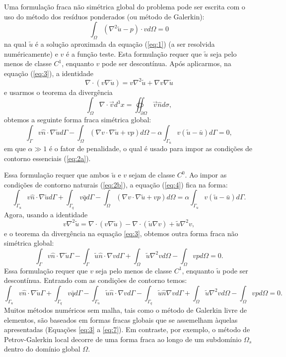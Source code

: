 \documentclass[10pt,a4paper]{article}
\newcommand{\prt}[1]{\left(#1\right)}
\begin{document}
	Uma formulação fraca não simétrica global do problema pode ser escrita com o uso do método dos resíduos ponderados (ou método de Galerkin):
	\begin{equation}
		\int_\Omega \prt{\nabla^2\tilde{u} - p}\cdot vd\Omega = 0
		\label{eq:3}
	\end{equation}
	na qual $\tilde{u}$ é a solução aproximada da equação (\ref{eq:1}) (a ser resolvida numéricamente) e $v$ é a função teste. Esta formulação requer que $\tilde{u}$ seja pelo menos de classe $C^1$, enquanto $v$ pode ser descontínua. Após aplicarmos, na equação (\ref{eq:3}), a identidade \[\nabla\cdot\prt{v\nabla\tilde{u}} = v\nabla^2\tilde{u} + \nabla v\nabla\tilde{u}\] e usarmos o teorema da divergência \[\int_\Omega\nabla\cdot\vec{v} d^3x = \oiint_{\partial\Omega}\vec{v}\hat{n}d\sigma,\] obtemos a seguinte forma fraca simétrica global:
	\begin{equation}
		\int_\Gamma v\hat{n}\cdot\nabla\tilde{u} d\Gamma - \int_\Omega\prt{\nabla v\cdot\nabla\tilde{u}+vp}d\Omega - \alpha\int_{\Gamma_u} v\prt{\tilde{u}-\bar{u}}d\Gamma = 0,
		\label{eq:4}
	\end{equation}
	em que $\alpha\gg 1$ é o fator de penalidade, o qual é usado para impor as condições de contorno essenciais (\ref{eq:2a}).

	Essa formulação requer que ambos $\tilde{u}$ e $v$ sejam de classe $C^0$. Ao impor as condições de contorno naturais (\ref{eq:2b}), a equação (\ref{eq:4}) fica na forma:
	\begin{equation}
		\int_{\Gamma_u} v\hat{n}\cdot\nabla\tilde{u} d\Gamma +\int_{\Gamma_q} v\bar{q}d\Gamma - \int_\Omega\prt{\nabla v\cdot\nabla\tilde{u}+vp}d\Omega = \alpha\int_{\Gamma_u} v\prt{\tilde{u}-\bar{u}}d\Gamma.
		\label{eq:5}
	\end{equation}
	Agora, usando a identidade \[v\nabla^2\tilde{u} = \nabla\cdot(v\nabla\tilde{u}) - \nabla\cdot(\tilde{u}\nabla v) + \tilde{u}\nabla^2v,\] e o teorema da divergência na equação \ref{eq:3}, obtemos outra forma fraca não simétrica global:
	\begin{equation}
		\int_{\Gamma} v\hat{n}\cdot\nabla\tilde{u}\Gamma - \int_{\Gamma} \tilde{u}\hat{n}\cdot\nabla vd\Gamma + \int_\Omega \tilde{u}\nabla^2vd\Omega - \int_\Omega vpd\Omega = 0.
		\label{eq:6}
	\end{equation}
	Essa formulação requer que $v$ seja pelo menos de classe $C^1$, enquanto $\tilde{u}$ pode ser descontínua. Entrando com as condições de contorno temos:
	\begin{equation}
		\int_{\Gamma_u} v\hat{n}\cdot\nabla\tilde{u}\Gamma + \int_{\Gamma_q}v\bar{q}d\Gamma - \int_{\Gamma_u} \tilde{u}\hat{n}\cdot\nabla vd\Gamma - \int_{\Gamma_q} \tilde{u}\hat{n}\nabla vd\Gamma + \int_\Omega \tilde{u}\nabla^2vd\Omega - \int_\Omega vpd\Omega = 0.
		\label{eq:7}
	\end{equation}
	Muitos métodos numéricos sem malha, tais como o método de Galerkin livre de elementos, são baseados em formas fracas globais que se assemelham àquelas apresentadas (Equações \ref{eq:3} a \ref{eq:7}). Em contraste, por exemplo, o método de Petrov-Galerkin local decorre de uma forma fraca ao longo de um subdomínio $\Omega_s$ dentro do domínio global $\Omega$.
\end{document}
